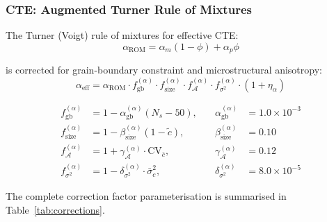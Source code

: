 \documentclass[11pt,a4paper]{article}
\begin{document}
\subsubsection{CTE: Augmented Turner Rule of Mixtures}

The Turner (Voigt) rule of mixtures for effective CTE:
\begin{equation}
    \alpha_{\text{ROM}} = \alpha_m(1 - \phi) + \alpha_p \phi
    \label{eq:turner}
\end{equation}

is corrected for grain-boundary constraint and microstructural anisotropy:
\begin{equation}
    \alpha_{\text{eff}} = \alpha_{\text{ROM}} \cdot f_{\text{gb}}^{(\alpha)} \cdot f_{\text{size}}^{(\alpha)} \cdot f_{\mathcal{A}}^{(\alpha)} \cdot f_{\sigma^2}^{(\alpha)} \cdot (1 + \eta_\alpha)
\end{equation}

\begin{align}
    f_{\text{gb}}^{(\alpha)}  &= 1 - \alpha_{\text{gb}}^{(\alpha)}(N_s - 50),  &\quad \alpha_{\text{gb}}^{(\alpha)}  &= 1.0 \times 10^{-3} \\
    f_{\text{size}}^{(\alpha)} &= 1 - \beta_{\text{size}}^{(\alpha)}(1 - \tilde{c}), &\quad \beta_{\text{size}}^{(\alpha)} &= 0.10 \\
    f_{\mathcal{A}}^{(\alpha)} &= 1 + \gamma_{\mathcal{A}}^{(\alpha)} \cdot \text{CV}_{\bar{c}}, &\quad \gamma_{\mathcal{A}}^{(\alpha)} &= 0.12 \\
    f_{\sigma^2}^{(\alpha)}    &= 1 - \delta_{\sigma^2}^{(\alpha)} \cdot \bar{\sigma}^2_c, &\quad \delta_{\sigma^2}^{(\alpha)} &= 8.0 \times 10^{-5}
\end{align}

The complete correction factor parameterisation is summarised in Table~\ref{tab:corrections}.
\end{document}
